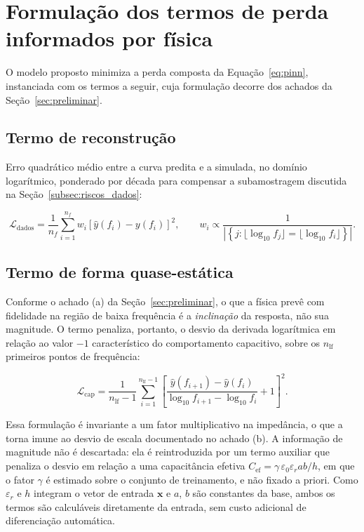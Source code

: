 \section{Formulação dos termos de perda informados por física}
\label{sec:perda}

O modelo proposto minimiza a perda composta da Equação~\ref{eq:pinn}, instanciada
com os termos a seguir, cuja formulação decorre dos achados da
Seção~\ref{sec:preliminar}.

\subsection{Termo de reconstrução}

Erro quadrático médio entre a curva predita e a simulada, no domínio
logarítmico, ponderado por década para compensar a subamostragem discutida na
Seção~\ref{subsec:riscos_dados}:

\begin{equation}
\mathcal{L}_{\text{dados}} = \frac{1}{n_f}\sum_{i=1}^{n_f} w_i
   \left[\hat{y}(f_i) - y(f_i)\right]^2,
\qquad
w_i \propto \frac{1}{\left|\left\{ j : \lfloor\log_{10} f_j\rfloor =
   \lfloor\log_{10} f_i\rfloor \right\}\right|}.
\label{eq:l_dados}
\end{equation}

\subsection{Termo de forma quase-estática}
\label{subsec:l_cap}

Conforme o achado (a) da Seção~\ref{sec:preliminar}, o que a física prevê com
fidelidade na região de baixa frequência é a \emph{inclinação} da resposta, não
sua magnitude. O termo penaliza, portanto, o desvio da derivada logarítmica em
relação ao valor $-1$ característico do comportamento capacitivo, sobre os
$n_{\text{lf}}$ primeiros pontos de frequência:

\begin{equation}
\mathcal{L}_{\text{cap}} = \frac{1}{n_{\text{lf}}-1}
   \sum_{i=1}^{n_{\text{lf}}-1}
   \left[\frac{\hat{y}(f_{i+1}) - \hat{y}(f_i)}
              {\log_{10} f_{i+1} - \log_{10} f_i} + 1\right]^2 .
\label{eq:l_cap}
\end{equation}

Essa formulação é invariante a um fator multiplicativo na impedância, o que a
torna imune ao desvio de escala documentado no achado (b). A informação de
magnitude não é descartada: ela é reintroduzida por um termo auxiliar que
penaliza o desvio em relação a uma capacitância efetiva
$C_{\text{ef}} = \gamma \, \varepsilon_0 \varepsilon_r ab/h$, em que o fator
$\gamma$ é estimado sobre o conjunto de treinamento, e não fixado a priori. Como
$\varepsilon_r$ e $h$ integram o vetor de entrada $\mathbf{x}$ e $a$, $b$ são
constantes da base, ambos os termos são calculáveis diretamente da entrada, sem
custo adicional de diferenciação automática.

